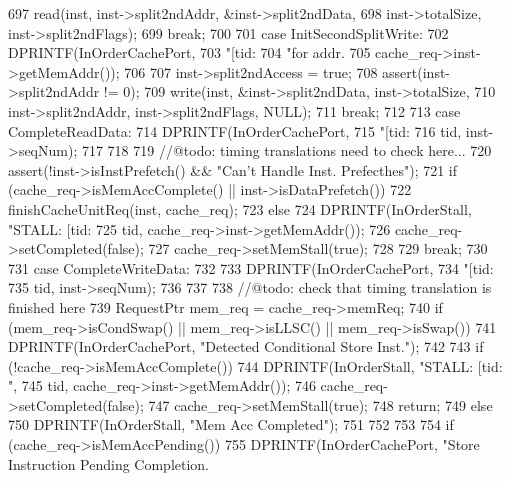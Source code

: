 \begin{DoxyCode}
{{697         read(inst, inst->split2ndAddr, &inst->split2ndData,
698              inst->totalSize, inst->split2ndFlags);
699         break;
700 
701       case InitSecondSplitWrite:
702         DPRINTF(InOrderCachePort,
703                 "[tid:%
704                 "for addr. %
705                 cache_req->inst->getMemAddr());
706 
707         inst->split2ndAccess = true;
708         assert(inst->split2ndAddr != 0);
709         write(inst, &inst->split2ndData, inst->totalSize,
710               inst->split2ndAddr, inst->split2ndFlags, NULL);
711         break;
712 
713       case CompleteReadData:
714         DPRINTF(InOrderCachePort,
715                 "[tid:%
716                 tid, inst->seqNum);
717 
718 
719         //@todo: timing translations need to check here...
720         assert(!inst->isInstPrefetch() && "Can't Handle Inst. Prefecthes");
721         if (cache_req->isMemAccComplete() || inst->isDataPrefetch()) {
722             finishCacheUnitReq(inst, cache_req);
723         } else {
724             DPRINTF(InOrderStall, "STALL: [tid:%
725                     tid, cache_req->inst->getMemAddr());
726             cache_req->setCompleted(false);
727             cache_req->setMemStall(true);            
728         }
729         break;
730 
731       case CompleteWriteData:
732         {
733             DPRINTF(InOrderCachePort,
734                     "[tid:%
735                     tid, inst->seqNum);
736 
737 
738             //@todo: check that timing translation is finished here
739             RequestPtr mem_req = cache_req->memReq;
740             if (mem_req->isCondSwap() || mem_req->isLLSC() || mem_req->isSwap()) 
      {
741                 DPRINTF(InOrderCachePort, "Detected Conditional Store Inst.\n");
742 
743                 if (!cache_req->isMemAccComplete()) {
744                     DPRINTF(InOrderStall, "STALL: [tid:%
      ",
745                             tid, cache_req->inst->getMemAddr());
746                     cache_req->setCompleted(false);
747                     cache_req->setMemStall(true);
748                     return;
749                 } else {
750                     DPRINTF(InOrderStall, "Mem Acc Completed\n");
751                 }
752             }
753 
754             if (cache_req->isMemAccPending()) {
755                 DPRINTF(InOrderCachePort, "Store Instruction Pending Completion.\
}}}}
\end{DoxyCode}
